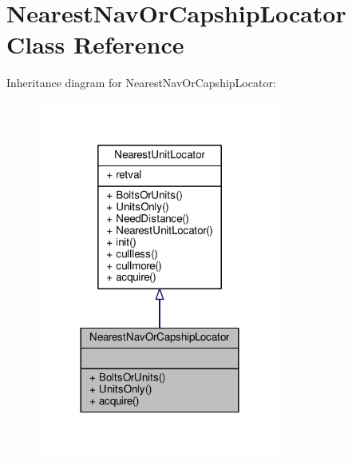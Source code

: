 \hypertarget{classNearestNavOrCapshipLocator}{}\section{Nearest\+Nav\+Or\+Capship\+Locator Class Reference}
\label{classNearestNavOrCapshipLocator}


Inheritance diagram for Nearest\+Nav\+Or\+Capship\+Locator\+:
\nopagebreak
\begin{figure}[H]
\begin{center}
\leavevmode
\includegraphics[width=228pt]{dc/d09/classNearestNavOrCapshipLocator__inherit__graph}
\end{center}
\end{figure}


